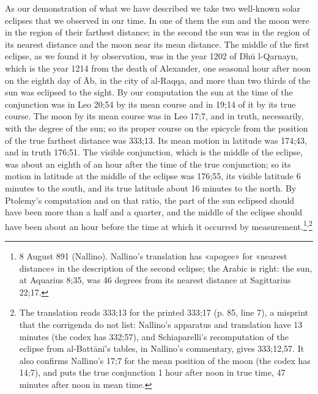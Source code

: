 \documentclass[11pt]{article}
\newcommand{\ArPage}[1]{\marginpar{\footnotesize\color{gray}Ar.\,p.\,#1}}
\begin{document}
\par \ArPage{85}As our demonstration of what we have described we take two well-known solar eclipses that we observed in our time. In one of them the sun and the moon were in the region of their farthest distance; in the second the sun was in the region of its nearest distance and the moon near its mean distance. The middle of the first eclipse, as we found it by observation, was in the year 1202 of Dhū l-Qarnayn, which is the year 1214 from the death of Alexander, one seasonal hour after noon on the eighth day of Āb, in the city of al-Raqqa, and more than two thirds of the sun was eclipsed to the sight. By our computation the sun at the time of the conjunction was in Leo 20;54 by its mean course and in 19;14 of it by its true course. The moon by its mean course was in Leo 17;7, and in truth, necessarily, with the degree of the sun; so its proper course on the epicycle from the position of the true farthest distance was 333;13. Its mean motion in latitude was 174;43, and in truth 176;51. The visible conjunction, which is the middle of the eclipse, was about an eighth of an hour after the time of the true conjunction; so its motion in latitude at the middle of the eclipse was 176;55, its visible latitude 6 minutes to the south, and its true latitude about 16 minutes to the north. By Ptolemy's computation and on that ratio, the part of the sun eclipsed should have been more than a half and a quarter, and the middle of the eclipse should have been about an hour before the time at which it occurred by measurement.\footnote{8 August 891 (Nallino). Nallino's translation has «apogee» for «nearest distance» in the description of the second eclipse; the Arabic is right: the sun, at Aquarius 8;35, was 46 degrees from its nearest distance at Sagittarius 22;17.}\textsuperscript{,}\footnote{The translation reads 333;13 for the printed 333;17 (p. 85, line 7), a misprint that the corrigenda do not list: Nallino's apparatus and translation have 13 minutes (the codex has 332;57), and Schiaparelli's recomputation of the eclipse from al-Battānī's tables, in Nallino's commentary, gives 333;12,57. It also confirms Nallino's 17;7 for the mean position of the moon (the codex has 14;7), and puts the true conjunction 1 hour after noon in true time, 47 minutes after noon in mean time.}\par
\end{document}
